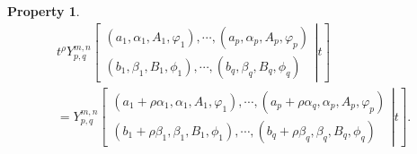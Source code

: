 \documentclass[12pt,onecolumn,draftcls]{IEEEtran}
\newtheorem{property}{Property}
\begin{document}
\begin{property}\label{prop:1}
\begin{multline}
{t^\rho }Y_{p,q}^{m,n}\left[ {\left. {\begin{array}{*{20}{c}}
{\left( {{a_1},{\alpha _1},{A_1},{\varphi _1}} \right), \cdots ,\left( {{a_p},{\alpha _p},{A_p},{\varphi _p}} \right)}\\
{\left( {{b_1},{\beta _1},{B_1},{\phi _1}} \right), \cdots ,\left( {{b_q},{\beta _q},{B_q},{\phi _q}} \right)}
\end{array}} \right|t} \right]\\
 = Y_{p,q}^{m,n}\left[ {\left. {\begin{array}{*{20}{c}}
{\left( {{a_1} + \rho {\alpha _1},{\alpha _1},{A_1},{\varphi _1}} \right), \cdots ,\left( {{a_p} + \rho {\alpha _q},{\alpha _p},{A_p},{\varphi _p}} \right)}\\
{\left( {{b_1} + \rho {\beta _1},{\beta _1},{B_1},{\phi _1}} \right), \cdots ,\left( {{b_q} + \rho {\beta _q},{\beta _q},{B_q},{\phi _q}} \right)}
\end{array}} \right|t} \right].
\end{multline}
\end{property}
\end{document}
